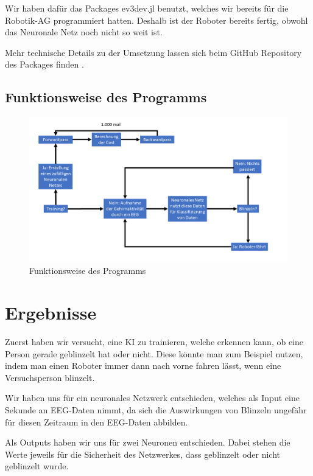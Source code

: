 \documentclass{scrartcl}
\begin{document}
	Wir haben dafür das Packages ev3dev.jl benutzt, welches wir bereits für die Robotik-AG programmiert hatten. Deshalb ist der Roboter bereits fertig, obwohl das Neuronale Netz noch nicht so weit ist.

	Mehr technische Details zu der Umsetzung lassen sich beim GitHub Repository des Packages finden \cite{ev3dev}.

	\subsection{Funktionsweise des Programms}

	\begin{figure}[h]
		\includegraphics[width=\textwidth]{pictures/Abbildung-des-Programms.png}
		\caption{Funktionsweise des Programms}
	\end{figure}
	
	
	\section{Ergebnisse}

	Zuerst haben wir versucht, eine KI zu trainieren, welche erkennen kann, ob eine Person gerade geblinzelt hat oder nicht. Diese könnte man zum Beispiel nutzen, indem man einen Roboter immer dann nach vorne fahren lässt, wenn eine Versuchsperson blinzelt.

	Wir haben uns für ein neuronales Netzwerk entschieden, welches als Input eine Sekunde an EEG-Daten nimmt, da sich die Auswirkungen von Blinzeln ungefähr für diesen Zeitraum in den EEG-Daten abbilden. 

	Als Outputs haben wir uns für zwei Neuronen entschieden. Dabei stehen die Werte jeweils für die Sicherheit des Netzwerkes, dass geblinzelt oder nicht geblinzelt wurde.
\end{document}
